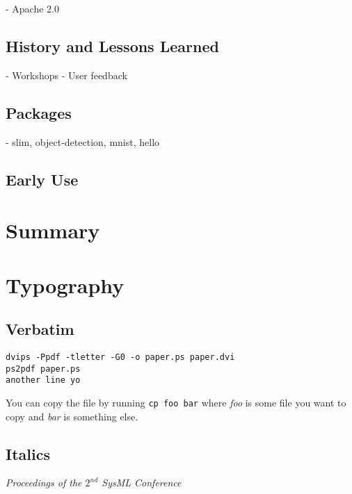 \documentclass{article}
\begin{document}
- Apache 2.0

\subsection{History and Lessons Learned}

- Workshops
- User feedback

\subsection{Packages}

- slim, object-detection, mnist, hello

\subsection{Early Use}

\section{Summary}



\section{Typography}


\subsection{Verbatim}

{\footnotesize
\begin{verbatim}
dvips -Ppdf -tletter -G0 -o paper.ps paper.dvi
ps2pdf paper.ps
another line yo
\end{verbatim}}

You can copy the file by running \verb|cp foo bar| where \textit{foo}
is some file you want to copy and \textit{bar} is something else.

\subsection{Italics}

\textit{Proceedings of the $\mathit{2}^{nd}$ SysML Conference}
\end{document}

